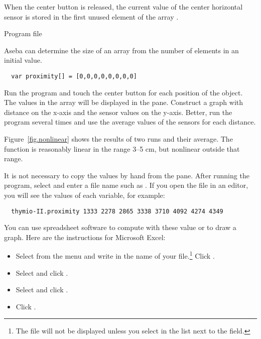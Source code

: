 
When the center button is released, the current value of the center
horizontal sensor is stored in the first unused element of the
array .


{\raggedleft \hfill Program file }

Aseba can determine the size of an array from the number of elements in
an initial value.

\begin{verbatim}
  var proximity[] = [0,0,0,0,0,0,0,0]
\end{verbatim}


Run the program and touch the center button for each position of the
object. The values in the array  will be displayed in the
 pane. Construct a graph with distance on the x-axis and
the sensor values on the y-axis. Better, run the program several times
and use the average values of the sensors for each distance.

Figure~\ref{fig.nonlinear} shows the results of two runs and their
average. The function is reasonably linear in the range 3--5 cm, but
nonlinear outside that range.



It is not necessary to copy the values by hand from the 
pane. After running the program, select 
and enter a file name such as . If you open the file in an
editor, you will see the values of each variable, for example:

\begin{verbatim}
  thymio-II.proximity 1333 2278 2865 3338 3710 4092 4274 4349 
\end{verbatim}

You can use spreadsheet software to compute with these value or to draw
a graph. Here are the instructions for Microsoft Excel:

\begin{itemize}

\item Select  from the menu and write in the name of your
file.\footnote{The file will not be displayed unless you select  in the list next to the  field.} Click .

\item Select  and click .

\item Select  and click .

\item Click .

\end{itemize}

